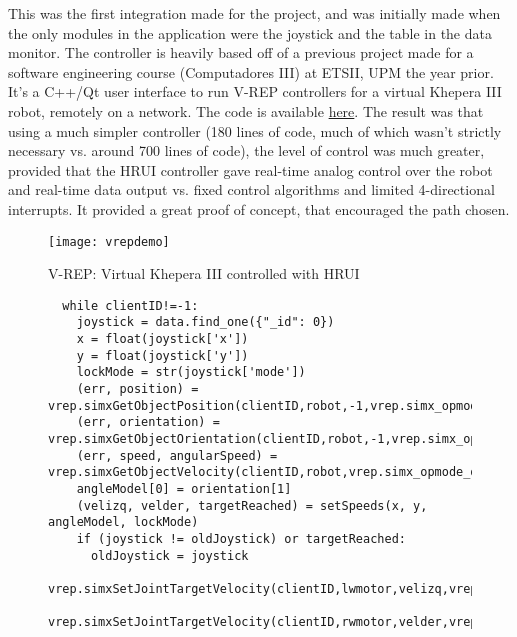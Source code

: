 This was the first integration made for the project, and was initially made when the only modules in the application were the joystick 
and the table in the data monitor. The controller is heavily based off of a previous project made for a software engineering course 
(Computadores III) at ETSII, UPM the year prior. It's a C++/Qt user interface to run V-REP controllers for a virtual Khepera III robot, 
remotely on a network. The code is available \href{https://github.com/xpeiro/computadores-III}{here}.  The result was that using a much 
simpler controller (180 lines of code, much of which wasn't strictly necessary vs. around 700 lines of code), the level of control was 
much greater, provided that the HRUI controller gave real-time analog control over the robot and real-time data output vs. fixed control 
algorithms and limited 4-directional interrupts. It provided a great proof of concept, that encouraged the path chosen.
\begin{figure}[H]
\centering
\texttt{[image: vrepdemo]}
\caption{V-REP: Virtual Khepera III controlled with HRUI}
\end{figure}
\begin{figure}[H]  
  \captionsetup{justification=centering}
  \begin{verbatim}
  while clientID!=-1: 
    joystick = data.find_one({"_id": 0})
    x = float(joystick['x'])
    y = float(joystick['y'])
    lockMode = str(joystick['mode'])
    (err, position) = vrep.simxGetObjectPosition(clientID,robot,-1,vrep.simx_opmode_oneshot)
    (err, orientation) = vrep.simxGetObjectOrientation(clientID,robot,-1,vrep.simx_opmode_oneshot)
    (err, speed, angularSpeed) = vrep.simxGetObjectVelocity(clientID,robot,vrep.simx_opmode_oneshot)
    angleModel[0] = orientation[1]
    (velizq, velder, targetReached) = setSpeeds(x, y, angleModel, lockMode)
    if (joystick != oldJoystick) or targetReached:      
      oldJoystick = joystick
      vrep.simxSetJointTargetVelocity(clientID,lwmotor,velizq,vrep.simx_opmode_oneshot)
      vrep.simxSetJointTargetVelocity(clientID,rwmotor,velder,vrep.simx_opmode_oneshot)
  \end{verbatim}
  \end{figure}
